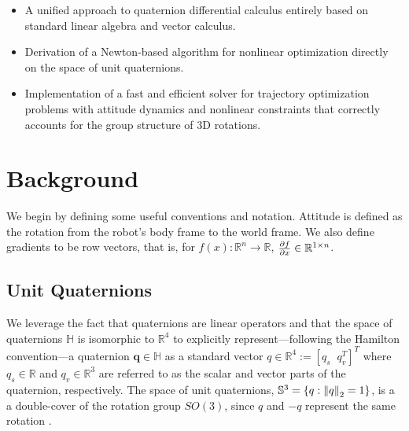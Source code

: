 \documentclass[letterpaper, 10 pt, conference]{ieeeconf}  %
\newcommand{\R}{\mathbb{R}}
\newcommand{\Q}{\mathbb{S}^3}
\newcommand{\q}{\textbf{q}}
\begin{document}
    \begin{itemize}
        \item A unified approach to quaternion differential calculus entirely based on
        standard linear algebra and vector calculus.
        \item Derivation of a Newton-based algorithm for nonlinear optimization directly
        on the space of unit quaternions.
        \item Implementation of a fast and efficient solver for trajectory optimization
        problems with attitude dynamics and nonlinear constraints that correctly accounts
        for the group structure of 3D rotations.
    \end{itemize}


\section{Background}

    We begin by defining some useful conventions and notation. 
    Attitude is defined as the rotation from the robot's body frame to the world frame.
    We also define gradients to be row vectors, that is, for 
        $f(x) : \R^n \to \R$, $\pdv{f}{x} \in \R^{1\times n}$.

    \subsection{Unit Quaternions} \label{sec:quaternions}
        We leverage the fact that quaternions are linear operators and that the space of
        quaternions $\mathbb{H}$ is isomorphic to $\R^4$ to explicitly
        represent---following the Hamilton convention---a quaternion $\q \in \mathbb{H}$
        as a standard vector $q \in \R^4 := [q_s \;\; q_v^T]^T$ where $q_s \in \R$ and
        $q_v \in \R^3$ are referred to as the scalar and vector parts of the quaternion,
        respectively. The space of unit quaternions, $\Q = \{q : \norm{q}_2 = 1\}$, is a 
        a double-cover of the rotation group $SO(3)$, since $q$ and $-q$ represent the same 
        rotation \cite{markley2014fundamentals}.
        
\end{document}
